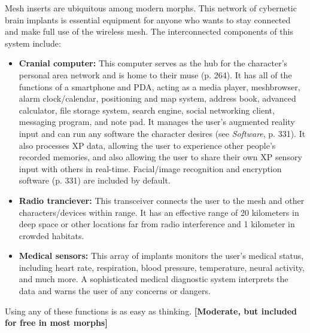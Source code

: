 Mesh inserts are ubiquitous among modern morphs. This network of cybernetic brain implants is essential equipment for anyone who wants to stay connected and make full use of the wireless mesh. The interconnected components of this system include: 

\begin{itemize} \item \textbf{Cranial computer:} This computer serves as the hub for the character’s personal area network and is home to their muse (p. 264). It has all of the functions of a smartphone and PDA, acting as a media player, meshbrowser, alarm clock/calendar, positioning and map system, address book, advanced calculator, file storage system, search engine, social networking client, messaging program, and note pad. It manages the user’s augmented reality input and can run any software the character desires (see \emph{Software}, p. 331). It also processes XP data, allowing the user to experience other people’s recorded memories, and also allowing the user to share their own XP sensory input with others in real-time. Facial/image recognition and encryption software (p. 331) are included by default. \item \textbf{Radio tranciever:} This transceiver connects the user to the mesh and other characters/devices within range. It has an effective range of 20 kilometers in deep space or other locations far from radio interference and 1 kilometer in crowded habitats. \item \textbf{Medical sensors:} This array of implants monitors the user’s medical status, including heart rate, respiration, blood pressure, temperature, neural activity, and much more. A sophisticated medical diagnostic system interprets the data and warns the user of any concerns or dangers. \end{itemize} 

Using any of these functions is as easy as thinking. \textbf{[Moderate, but included for free in most morphs]} 

